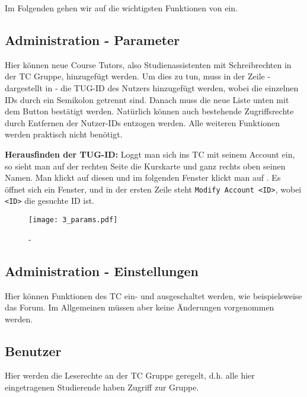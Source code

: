 Im Folgenden gehen wir auf die wichtigsten Funktionen von
 ein.

\subsection{Administration - Parameter}

Hier können neue \glqq{}Course Tutors\grqq{}, also Studienassistenten mit
Schreibrechten in der TC Gruppe, hinzugefügt werden. Um dies zu tun, muss in
der Zeile  - dargestellt in  - 
die TUG-ID des Nutzers hinzugefügt werden, wobei die einzelnen IDs durch ein 
Semikolon getrennt sind. Danach muss die neue Liste unten mit dem Button 
 bestätigt werden. Natürlich können auch bestehende Zugriffsrechte 
durch Entfernen der Nutzer-IDs entzogen werden. Alle weiteren Funktionen werden 
praktisch nicht benötigt.

{\bf Herausfinden der TUG-ID:} Loggt man sich ins TC mit seinem Account ein, so
sieht man auf der rechten Seite die Kurskarte und ganz rechts oben seinen Namen.
Man klickt auf diesen und im folgenden Fenster klickt man auf
. Es öffnet sich ein Fenster, und in der ersten Zeile
steht {\tt Modify Account \grqq{}<ID>\grqq{}}, wobei {\tt <ID>} die gesuchte
ID ist.

\begin{figure}[htbp]
\begin{center}
  \texttt{[image: 3\_params.pdf]}
  \caption{  -  }
  \label{fig:params}
\end{center}
\end{figure}

\subsection{Administration - Einstellungen}

Hier können Funktionen des TC ein- und ausgeschaltet werden, wie beispielsweise
das Forum. Im Allgemeinen müssen aber keine Änderungen vorgenommen werden.

\subsection{Benutzer}

Hier werden die Leserechte an der TC Gruppe geregelt, d.h. alle hier 
eingetragenen Studierende haben Zugriff zur Gruppe. 

